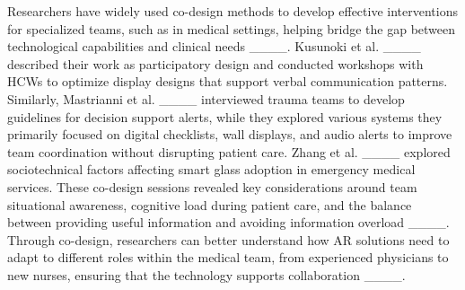 Researchers have widely used co-design methods to develop effective interventions for specialized teams, such as in medical settings, helping bridge the gap between technological capabilities and clinical needs ____. Kusunoki et al. ____ described their work as participatory design and conducted workshops with HCWs to optimize display designs that support verbal communication patterns. Similarly, Mastrianni et al. ____ interviewed trauma teams to develop guidelines for decision support alerts, while they explored various systems they primarily focused on digital checklists, wall displays, and audio alerts to improve team coordination without disrupting patient care. %
Zhang et al. ____ explored sociotechnical factors affecting smart glass adoption in emergency medical services. %
These co-design sessions revealed key considerations around team situational awareness, cognitive load during patient care, and the balance between providing useful information and avoiding information overload ____. 
Through co-design, researchers can better understand how AR solutions need to adapt to different roles within the medical team, from experienced physicians to new nurses, ensuring that the technology supports collaboration ____.



